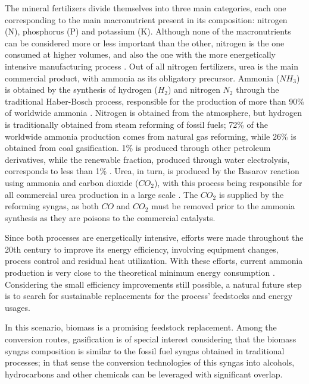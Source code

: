 \documentclass[a4paper, titlepage]{article}
\begin{document}
The mineral fertilizers divide themselves into three main categories, each one corresponding to the main
macronutrient present in its composition: nitrogen (N), phosphorus (P) and potassium (K). Although none of the
macronutrients can be considered more or less important than the other, nitrogen is the one consumed at higher
volumes, and also the one with the more energetically intensive manufacturing
process \cite{ieaAmmoniaTechnologyRoadmap2021}. Out of all nitrogen fertilizers, urea is the main commercial product,
with ammonia as its obligatory precursor. Ammonia ($NH_3$) is obtained by the synthesis of hydrogen ($H_2$)
and nitrogen $N_2$ through the traditional Haber-Bosch process, responsible for the production of more than 90\% of
worldwide ammonia \cite{applAmmoniaPrinciplesIndustrial1999}. Nitrogen is obtained from the atmosphere,
but hydrogen is traditionally obtained from steam reforming of fossil fuels; 72\% of the worldwide ammonia
production comes from natural gas reforming, while 26\% is obtained from coal gasification. 1\% is produced
through other petroleum derivatives, while the renewable fraction, produced through water electrolysis,
corresponds to less than 1\% \cite{ieaAmmoniaTechnologyRoadmap2021}. Urea, in turn, is produced by the Basarov reaction
using ammonia and carbon dioxide ($CO_2$), with this process being responsible for all commercial urea production
in a large scale \cite{meessenUrea2010}. The $CO_2$ is supplied by the reforming syngas, as both $CO$ and $CO_2$ must
be removed prior to the ammonia synthesis as they are poisons to the commercial catalysts.

Since both processes are energetically intensive, efforts were made throughout the 20th century to improve its energy
efficiency, involving equipment changes, process control and residual heat utilization. With these efforts, current
ammonia production is very close to the theoretical minimum energy consumption \cite{ieaAmmoniaTechnologyRoadmap2021}.
Considering the small efficiency improvements still possible, a natural future step is to search for sustainable
replacements for the process’ feedstocks and energy usages.

In this scenario, biomass is a promising feedstock replacement. Among the conversion routes, gasification is of special
interest considering that the biomass syngas composition is similar to the fossil fuel syngas obtained in traditional
processes; in that sense the conversion technologies of this syngas into alcohols, hydrocarbons and other chemicals
can be leveraged with significant overlap.
\end{document}
